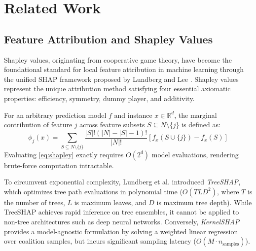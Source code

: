 \documentclass[conference]{IEEEtran}
\begin{document}
\section{Related Work}
\subsection{Feature Attribution and Shapley Values}
Shapley values, originating from cooperative game theory, have become the foundational standard for local feature attribution in machine learning through the unified SHAP framework proposed by Lundberg and Lee \cite{lundberg2017unified}. Shapley values represent the unique attribution method satisfying four essential axiomatic properties: efficiency, symmetry, dummy player, and additivity. 

For an arbitrary prediction model $f$ and instance $x \in \mathbb{R}^d$, the marginal contribution of feature $j$ across feature subsets $S \subseteq N \setminus \{j\}$ is defined as:
\begin{equation}
\phi_j(x) = \sum_{S \subseteq N \setminus \{j\}} \frac{|S|!(|N| - |S| - 1)!}{|N|!} \left[ f_x(S \cup \{j\}) - f_x(S) \right]
\label{eq:shapley}
\end{equation}
Evaluating \eqref{eq:shapley} exactly requires $O(2^d)$ model evaluations, rendering brute-force computation intractable.

To circumvent exponential complexity, Lundberg et al. \cite{lundberg2020local} introduced \textit{TreeSHAP}, which optimizes tree path evaluations in polynomial time ($O(TLD^2)$, where $T$ is the number of trees, $L$ is maximum leaves, and $D$ is maximum tree depth). While TreeSHAP achieves rapid inference on tree ensembles, it cannot be applied to non-tree architectures such as deep neural networks. Conversely, \textit{KernelSHAP} \cite{lundberg2017unified} provides a model-agnostic formulation by solving a weighted linear regression over coalition samples, but incurs significant sampling latency ($O(M \cdot n_{\text{samples}})$).
\end{document}
